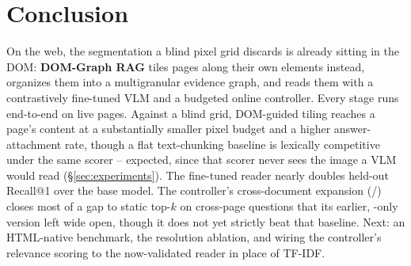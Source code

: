 \section{Conclusion}
\label{sec:conclusion}

On the web, the segmentation a blind pixel grid discards is already sitting in the DOM: \textbf{DOM-Graph RAG} tiles pages along their own elements instead, organizes them into a multigranular evidence graph, and reads them with a contrastively fine-tuned VLM and a budgeted online controller. Every stage runs end-to-end on live pages. Against a blind grid, DOM-guided tiling reaches a page's content at a substantially smaller pixel budget and a higher answer-attachment rate, though a flat text-chunking baseline is lexically competitive under the same scorer -- expected, since that scorer never sees the image a VLM would read (\S\ref{sec:experiments}). The fine-tuned reader nearly doubles held-out Recall@1 over the base model. The controller's cross-document expansion (/) closes most of a gap to static top-$k$ on cross-page questions that its earlier, -only version left wide open, though it does not yet strictly beat that baseline. Next: an HTML-native benchmark, the resolution ablation, and wiring the controller's relevance scoring to the now-validated reader in place of TF-IDF.
